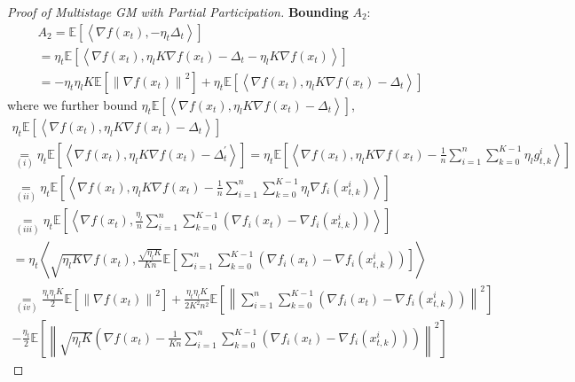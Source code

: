 \begin{proof}[Proof of Multistage GM with Partial Participation]
\textbf{Bounding} $A_2$:
\begin{equation}
\begin{gathered}
A_2=\mathbb{E}\left[\left\langle \nabla f(x_t),-\eta_t \Delta_t \right\rangle\right]\\
=\eta_t\mathbb{E}\left[\left\langle \nabla f\left(x_t\right),\eta_l K \nabla f\left(x_t\right) - \Delta_t - \eta_l K \nabla f\left(x_t\right)  \right\rangle\right]\\
=-\eta_t \eta_l K \mathbb{E}\left [\left\| \nabla f\left(x_t\right) \right\|^2\right]+\eta_t\mathbb{E}\left[\left\langle \nabla f\left(x_t\right), \eta_l K \nabla f\left(x_t\right) - \Delta_t \right\rangle\right]
\end{gathered}\nonumber
\end{equation}
where we further bound $\eta_t\mathbb{E}\left[\left\langle \nabla f\left(x_t\right), \eta_l K \nabla f\left(x_t\right) - \Delta_t \right\rangle\right]$,
\begin{equation}
\begin{gathered}
\eta_t\mathbb{E}\left[\left\langle \nabla f\left(x_t\right), \eta_l K \nabla f\left(x_t\right) - \Delta_t \right\rangle\right]\\
\underset{(i)}{=} \eta_t\mathbb{E}\left[\left\langle \nabla f\left(x_t\right), \eta_l K \nabla f\left(x_t\right) - \Delta^\prime_t \right\rangle\right]=
\eta_t\mathbb{E}\left[\left\langle \nabla f\left(x_t\right), \eta_l K \nabla f\left(x_t\right) - \frac{1}{n}\sum_{i=1}^n\sum_{k=0}^{K-1}\eta_l g_{t,k}^i \right\rangle\right]\\
\underset{(ii)}{=}\eta_t\mathbb{E}\left[\left\langle \nabla f\left(x_t\right), \eta_l K \nabla f\left(x_t\right) - \frac{1}{n}\sum_{i=1}^n\sum_{k=0}^{K-1}\eta_l \nabla f_i(x^i_{t,k}) \right\rangle\right]\\
\underset{(iii)}{=} \eta_t \mathbb{E}\left[\left\langle \nabla f\left(x_t\right), \frac{\eta_l}{n}\sum_{i=1}^n\sum_{k=0}^{K-1} \left(\nabla f_i(x_t)-\nabla f_i(x^i_{t,k})\right) \right\rangle\right]\\
= \eta_t \left\langle \sqrt{\eta_l K} \nabla f(x_t), \frac{\sqrt{\eta_l K}}{K n} \mathbb{E}\left[\sum_{i=1}^n\sum_{k=0}^{K-1} \left(\nabla f_i(x_t)-\nabla f_i(x^i_{t,k})\right)\right] \right\rangle\\
\underset{(iv)}{=} \frac{\eta_t \eta_l K}{2} \mathbb{E} \left[ \left\|\nabla f(x_t)\right\|^2 \right]+\frac{\eta_t \eta_l K}{2 K^2 n^2}\mathbb{E}\left[\left\|\sum_{i=1}^n\sum_{k=0}^{K-1} \left(\nabla f_i(x_t)-\nabla f_i(x^i_{t,k})\right)\right\|^2\right]\\
-\frac{\eta_t}{2}\mathbb{E}\left[\left\|\sqrt{\eta_l K}\left(\nabla f(x_t)-\frac{1}{Kn}\sum_{i=1}^n\sum_{k=0}^{K-1} \left(\nabla f_i(x_t)-\nabla f_i(x^i_{t,k})\right)\right)\right\|^2\right]
\end{gathered}\nonumber
\end{equation}


\end{proof}
